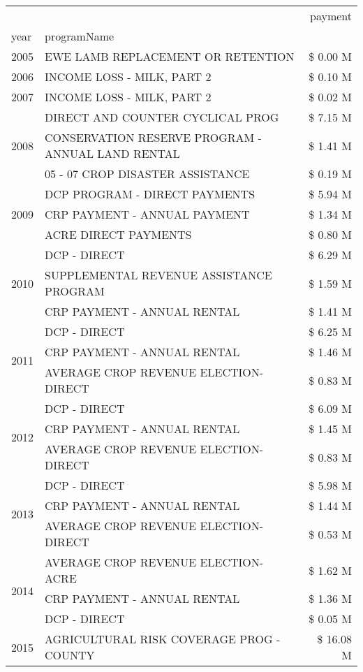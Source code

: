 \begin{tabular}{llr}
\toprule
 &  & payment \\
year & programName &  \\
\midrule
2005 & EWE LAMB REPLACEMENT OR RETENTION & \$ 0.00 M \\
\cline{1-3}
2006 & INCOME LOSS - MILK, PART 2 & \$ 0.10 M \\
\cline{1-3}
2007 & INCOME LOSS - MILK, PART 2 & \$ 0.02 M \\
\cline{1-3}
\multirow[t]{3}{*}{2008} & DIRECT AND COUNTER CYCLICAL PROG & \$ 7.15 M \\
 & CONSERVATION RESERVE PROGRAM - ANNUAL LAND RENTAL & \$ 1.41 M \\
 & 05 - 07 CROP DISASTER ASSISTANCE & \$ 0.19 M \\
\cline{1-3}
\multirow[t]{3}{*}{2009} & DCP PROGRAM - DIRECT PAYMENTS & \$ 5.94 M \\
 & CRP PAYMENT - ANNUAL PAYMENT & \$ 1.34 M \\
 & ACRE DIRECT PAYMENTS & \$ 0.80 M \\
\cline{1-3}
\multirow[t]{3}{*}{2010} & DCP - DIRECT & \$ 6.29 M \\
 & SUPPLEMENTAL REVENUE ASSISTANCE PROGRAM & \$ 1.59 M \\
 & CRP PAYMENT - ANNUAL RENTAL & \$ 1.41 M \\
\cline{1-3}
\multirow[t]{3}{*}{2011} & DCP - DIRECT & \$ 6.25 M \\
 & CRP PAYMENT - ANNUAL RENTAL & \$ 1.46 M \\
 & AVERAGE CROP REVENUE ELECTION-DIRECT & \$ 0.83 M \\
\cline{1-3}
\multirow[t]{3}{*}{2012} & DCP - DIRECT & \$ 6.09 M \\
 & CRP PAYMENT - ANNUAL RENTAL & \$ 1.45 M \\
 & AVERAGE CROP REVENUE ELECTION-DIRECT & \$ 0.83 M \\
\cline{1-3}
\multirow[t]{3}{*}{2013} & DCP - DIRECT & \$ 5.98 M \\
 & CRP PAYMENT - ANNUAL RENTAL & \$ 1.44 M \\
 & AVERAGE CROP REVENUE ELECTION-DIRECT & \$ 0.53 M \\
\cline{1-3}
\multirow[t]{3}{*}{2014} & AVERAGE CROP REVENUE ELECTION-ACRE & \$ 1.62 M \\
 & CRP PAYMENT - ANNUAL RENTAL & \$ 1.36 M \\
 & DCP - DIRECT & \$ 0.05 M \\
\cline{1-3}
\multirow[t]{3}{*}{2015} & AGRICULTURAL RISK COVERAGE PROG - COUNTY & \$ 16.08 M \\

\end{tabular}
